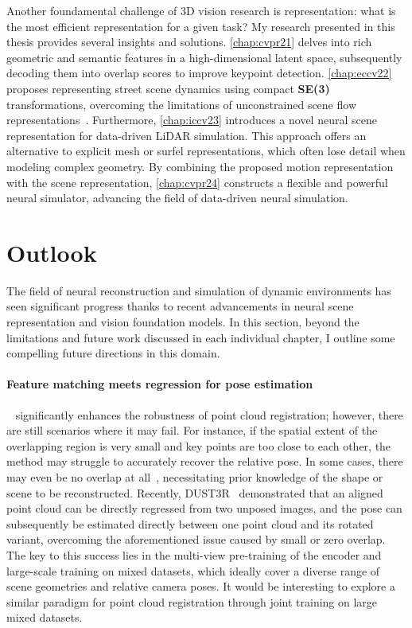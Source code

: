 Another foundamental challenge of 3D vision research is representation: what is the most efficient representation for a given task? My research presented in this thesis provides several insights and solutions. \cref{chap:cvpr21} delves into rich geometric and semantic features in a high-dimensional latent space, subsequently decoding them into overlap scores to improve keypoint detection. \cref{chap:eccv22} proposes representing street scene dynamics using compact \textbf{SE(3)} transformations, overcoming the limitations of unconstrained scene flow representations~\cite{wu2019pointpwc}. Furthermore, \cref{chap:iccv23} introduces a novel neural scene representation for data-driven LiDAR simulation. This approach offers an alternative to explicit mesh or surfel representations, which often lose detail when modeling complex geometry. By combining the proposed motion representation with the scene representation, \cref{chap:cvpr24} constructs a flexible and powerful neural simulator, advancing the field of data-driven neural simulation.


\section{Outlook}
The field of neural reconstruction and simulation of dynamic environments has seen significant progress thanks to recent advancements in neural scene representation and vision foundation models. In this section, beyond the limitations and future work discussed in each individual chapter, I outline some compelling future directions in this domain.


\paragraph{Feature matching meets regression for pose estimation}
\acro~\cite{huang2021predator} significantly enhances the robustness of point cloud registration; however, there are still scenarios where it may fail. For instance, if the spatial extent of the overlapping region is very small and key points are too close to each other, the method may struggle to accurately recover the relative pose. In some cases, there may even be no overlap at all~\cite{xu2023point}, necessitating prior knowledge of the shape or scene to be reconstructed. Recently, DUST3R~\cite{wang2024dust3r,leroy2024grounding} demonstrated that an aligned point cloud can be directly regressed from two unposed images, and the pose can subsequently be estimated directly between one point cloud and its rotated variant, overcoming the aforementioned issue caused by small or zero overlap. The key to this success lies in the multi-view pre-training of the encoder and large-scale training on mixed datasets, which ideally cover a diverse range of scene geometries and relative camera poses. It would be interesting to explore a similar paradigm for point cloud registration through joint training on large mixed datasets.


